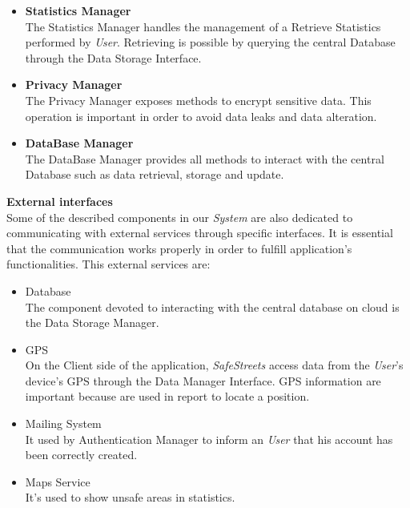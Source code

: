 \documentclass{article}
\begin{document}
\begin{itemize}
    \item \textbf{Statistics Manager} \\
    The Statistics Manager handles the management of a Retrieve Statistics performed by \textit{User}. Retrieving 
    is possible by querying the central Database through the Data Storage Interface.     
    \item \textbf{Privacy Manager} \\
    The Privacy Manager exposes methods to encrypt sensitive data. This operation is important in order to avoid data leaks
    and data alteration.
    \item \textbf{DataBase Manager} \\
    The DataBase Manager provides all methods to interact with the central Database such as data retrieval, 
    storage and update.
    
\end{itemize}

\textbf{External interfaces} \\
Some of the described components in our \textit{System} are also dedicated to communicating with external services through 
specific interfaces. It is essential that the communication works properly in order to fulfill application's functionalities.
This external services are:
\begin{itemize}
    \item Database \\
    The component devoted to interacting with the central database on cloud is the Data Storage Manager.
    \item GPS \\
    On the Client side of the application, \textit{SafeStreets} access data from the \textit{User}'s device's GPS through
    the Data Manager Interface. GPS information are important because are used in report to locate a position. 
    \item Mailing System \\
    It used by Authentication Manager to inform an \textit{User} that his account has been correctly created. 
    \item Maps Service \\ 
    It's used to show unsafe areas in statistics.  
\end{itemize}  
\end{document}
